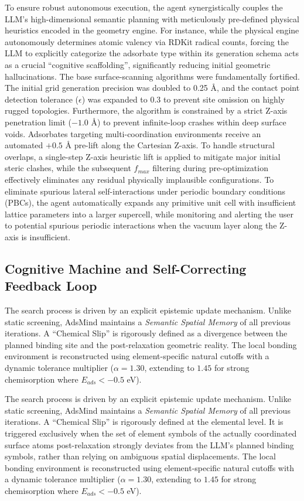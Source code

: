 \documentclass{article}
\begin{document}
To ensure robust autonomous execution, the agent synergistically couples the LLM's high-dimensional semantic planning with meticulously pre-defined physical heuristics encoded in the geometry engine. For instance, while the physical engine autonomously determines atomic valency via RDKit radical counts, forcing the LLM to explicitly categorize the adsorbate type within its generation schema acts as a crucial ``cognitive scaffolding'', significantly reducing initial geometric hallucinations. The base surface-scanning algorithms were fundamentally fortified. The initial grid generation precision was doubled to 0.25 \AA{}, and the contact point detection tolerance ($\epsilon$) was expanded to 0.3 to prevent site omission on highly rugged topologies. Furthermore, the algorithm is constrained by a strict Z-axis penetration limit ($-1.0$ \AA{}) to prevent infinite-loop crashes within deep surface voids. Adsorbates targeting multi-coordination environments receive an automated $+0.5$ \AA{} pre-lift along the Cartesian Z-axis. To handle structural overlaps, a single-step Z-axis heuristic lift is applied to mitigate major initial steric clashes, while the subsequent $f_{max}$ filtering during pre-optimization effectively eliminates any residual physically implausible configurations. To eliminate spurious lateral self-interactions under periodic boundary conditions (PBCs), the agent automatically expands any primitive unit cell with insufficient lattice parameters into a larger supercell, while monitoring and alerting the user to potential spurious periodic interactions when the vacuum layer along the Z-axis is insufficient.

\subsection{Cognitive Machine and Self-Correcting Feedback Loop}
The search process is driven by an explicit epistemic update mechanism. Unlike static screening, AdsMind maintains a \textit{Semantic Spatial Memory} of all previous iterations. A ``Chemical Slip'' is rigorously defined as a divergence between the planned binding site and the post-relaxation geometric reality. The local bonding environment is reconstructed using element-specific natural cutoffs with a dynamic tolerance multiplier ($\alpha = 1.30$, extending to $1.45$ for strong chemisorption where $E_{ads} < -0.5$ eV).

The search process is driven by an explicit epistemic update mechanism. Unlike static screening, AdsMind maintains a \textit{Semantic Spatial Memory} of all previous iterations. A ``Chemical Slip'' is rigorously defined at the elemental level. It is triggered exclusively when the set of element symbols of the actually coordinated surface atoms post-relaxation strongly deviates from the LLM's planned binding symbols, rather than relying on ambiguous spatial displacements. The local bonding environment is reconstructed using element-specific natural cutoffs with a dynamic tolerance multiplier ($\alpha = 1.30$, extending to $1.45$ for strong chemisorption where $E_{ads} < -0.5$ eV).
\end{document}
